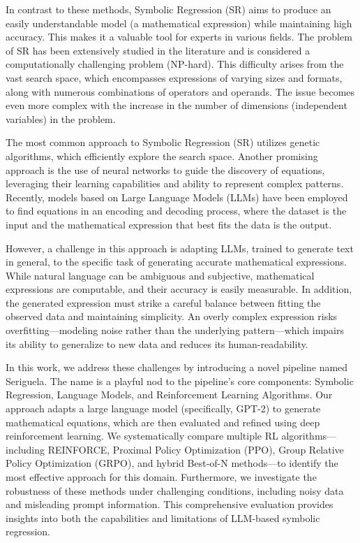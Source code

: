 In contrast to these methods, Symbolic Regression (SR) aims to produce an easily understandable model (a mathematical expression) while maintaining high accuracy. This makes it a valuable tool for experts in various fields. The problem of SR has been extensively studied in the literature and is considered a computationally challenging problem (NP-hard). This difficulty arises from the vast search space, which encompasses expressions of varying sizes and formats, along with numerous combinations of operators and operands. The issue becomes even more complex with the increase in the number of dimensions (independent variables) in the problem.

The most common approach to Symbolic Regression (SR) utilizes genetic algorithms, which efficiently explore the search space. Another promising approach is the use of neural networks to guide the discovery of equations, leveraging their learning capabilities and ability to represent complex patterns. Recently, models based on Large Language Models (LLMs) have been employed to find equations in an encoding and decoding process, where the dataset is the input and the mathematical expression that best fits the data is the output.

However, a challenge in this approach is adapting LLMs, trained to generate text in general, to the specific task of generating accurate mathematical expressions. While natural language can be ambiguous and subjective, mathematical expressions are computable, and their accuracy is easily measurable. In addition, the generated expression must strike a careful balance between fitting the observed data and maintaining simplicity. An overly complex expression risks overfitting—modeling noise rather than the underlying pattern—which impairs its ability to generalize to new data and reduces its human-readability.

In this work, we address these challenges by introducing a novel pipeline named Seriguela. The name is a playful nod to the pipeline's core components: Symbolic Regression, Language Models, and Reinforcement Learning Algorithms. Our approach adapts a large language model (specifically, GPT-2) to generate mathematical equations, which are then evaluated and refined using deep reinforcement learning. We systematically compare multiple RL algorithms---including REINFORCE, Proximal Policy Optimization (PPO), Group Relative Policy Optimization (GRPO), and hybrid Best-of-N methods---to identify the most effective approach for this domain. Furthermore, we investigate the robustness of these methods under challenging conditions, including noisy data and misleading prompt information. This comprehensive evaluation provides insights into both the capabilities and limitations of LLM-based symbolic regression.

